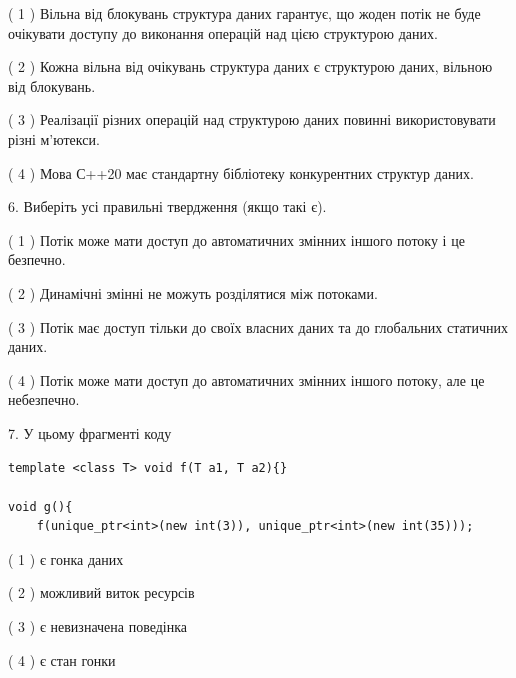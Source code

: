 \documentclass[12pt, ukrainian]{article}
\begin{document}
\begin {large}
{( 1 ) Вільна від блокувань структура даних гарантує, що жоден потік не буде очікувати доступу до виконання операцій над цією структурою даних.%

( 2 ) Кожна вільна від очікувань структура даних є структурою даних, вільною від блокувань.%

( 3 ) Реалізації різних операцій над структурою даних повинні використовувати різні м’ютекси.%

( 4 ) Мова С++20 має стандартну бібліотеку конкурентних структур даних.%
\newpage



\vspace{5mm}
6. Виберіть усі правильні твердження (якщо такі є).\par
\vspace{2mm}

( 1 ) Потік може мати доступ до автоматичних змінних іншого потоку і це безпечно.%

( 2 ) Динамічні змінні не можуть розділятися між потоками.%

( 3 ) Потік має доступ тільки до своїх власних даних та до глобальних статичних даних.%

( 4 ) Потік може мати доступ до автоматичних змінних іншого потоку, але це небезпечно.%


\vspace{5mm}
7. У цьому фрагменті коду
\begin{verbatim}
template <class T> void f(T a1, T a2){}

void g(){
    f(unique_ptr<int>(new int(3)), unique_ptr<int>(new int(35)));
\end{verbatim}

( 1 ) є гонка даних%

( 2 ) можливий виток ресурсів%

( 3 ) є невизначена поведінка%

( 4 ) є стан гонки%
}
\end {large}
\end{document}
